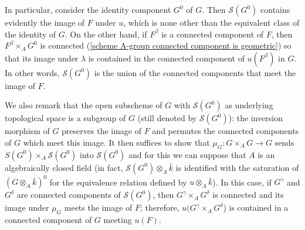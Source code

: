 In particular, consider the identity component $G^0$ of $G$. Then $\mathcal{S}(G^0)$ contains evidently the image of $F$ under $u$, which is none other than the equivalent class of the identity of $G$. On the other hand, if $F^\beta$ is a connected component of $F$, then $F^\beta\times_AG^0$ is connected (\cref{scheme A-group connected component is geometric}) so that its image under $\lambda$ is contained in the connected component of $u(F^\beta)$ in $G$. In other words, $\mathcal{S}(G^0)$ is the union of the connected components that meet the image of $F$.\par
We also remark that the open subscheme of $G$ with $\mathcal{S}(G^0)$ as underlying topological space is a subgroup of $G$ (still denoted by $\mathcal{S}(G^0)$): the inversion morphism of $G$ preserves the image of $F$ and permutes the connected components of $G$ which meet this image. It then suffices to show that $\mu_G:G\times_AG\to G$ sends $S(G^0)\times_A\mathcal{S}(G^0)$ into $\mathcal{S}(G^0)$ and for this we can suppose that $A$ is an algebraically closed field (in fact, $\mathcal{S}(G^0)\otimes_A\bar{k}$ is identified with the saturation of $(G\otimes_A\bar{k})^0$ for the equivalence relation defined by $u\otimes_A\bar{k}$). In this case, if $G^\gamma$ and $G^\delta$ are connected components of $\mathcal{S}(G^0)$, then $G^\gamma\times_AG^\delta$ is connected and its image under $\mu_G$ meets the image of $F$; therefore, $u(G^\gamma\times_AG^\delta$) is contained in a connected component of $G$ meeting $u(F)$.\par

